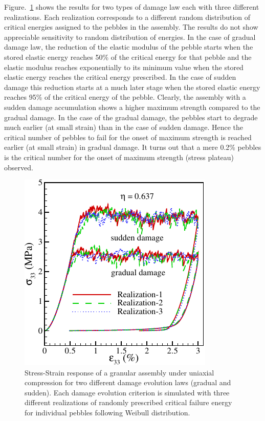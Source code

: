 Figure.~\ref{fig:stress-strain-effect} shows the results for two types of damage law each with three different realizations. Each realization corresponds to a different random distribution of critical energies assigned to the pebbles in the assembly. The results do not show appreciable sensitivity to random distribution of energies. In the case of gradual damage law, the reduction of the elastic modulus of the pebble starts when the stored elastic energy reaches 50\% of the critical energy for that pebble and the elastic modulus reaches exponentially to its minimum value when the stored elastic energy reaches the critical energy prescribed. In the case of sudden damage this reduction starts at a much later stage when the stored elastic energy reaches 95\% of the critical energy of the pebble. Clearly, the assembly with a sudden damage accumulation shows a higher maximum strength compared to the gradual damage. In the case of the gradual damage, the pebbles start to degrade much earlier (at small strain) than in the case of sudden damage. Hence the critical number of pebbles to fail for the onset of maximum strength is reached earlier (at small strain) in gradual damage. It turns out that a mere 0.2\% pebbles is the critical number for the onset of maximum strength (stress plateau) observed.

\begin{figure}[!ht]
\centering
\includegraphics[width=\singleimagewidth]{figures/Fig-5}
\caption{Stress-Strain response of a granular assembly under uniaxial compression for two different damage evolution laws (gradual and sudden). Each damage evolution criterion is simulated with three different realizations of randomly prescribed critical failure energy for individual pebbles following Weibull distribution.}
\label{fig:stress-strain-effect}
\end{figure}

